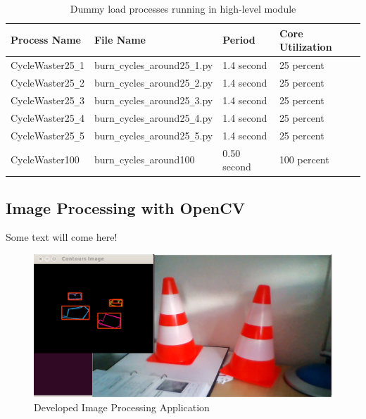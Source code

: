 \begin{itemize}
	\begin{table}[h!]
		\begin{tabular}{|l|l|l|l|}
			\hline
			Process Name & File Name & Period & Core Utilization \\
			\hline
			\hline
			CycleWaster25\texttt{\_}1 & burn\texttt{\_}cycles\texttt{\_}around25\texttt{\_}1.py & 1.4 second & 25 percent \\
			\hline
			CycleWaster25\texttt{\_}2 & burn\texttt{\_}cycles\texttt{\_}around25\texttt{\_}2.py & 1.4 second &  25 percent \\
			\hline
			CycleWaster25\texttt{\_}3 & burn\texttt{\_}cycles\texttt{\_}around25\texttt{\_}3.py & 1.4 second &  25 percent \\
			\hline
			CycleWaster25\texttt{\_}4 & burn\texttt{\_}cycles\texttt{\_}around25\texttt{\_}4.py & 1.4 second &  25 percent \\
			\hline
			CycleWaster25\texttt{\_}5 & burn\texttt{\_}cycles\texttt{\_}around25\texttt{\_}5.py & 1.4 second &  25 percent \\
			\hline
			CycleWaster100 & burn\texttt{\_}cycles\texttt{\_}around100 & 0.50 second & 100 percent \\
			\hline
		\end{tabular}
		\caption{Dummy load processes running in high-level module}
		\label{tbl_dummyloads}
	\end{table}
	
\end{itemize}

\subsection{Image Processing with OpenCV}
Some text will come here! \\
\begin{figure}[!ht]
	\centering
	\captionsetup{justification=centering}
	\includegraphics[scale=0.15]{content/images/traffic_cone_detection.png}
	\caption{Developed Image Processing Application}
	\label{fig:traffic_cone_detection}
\end{figure}
